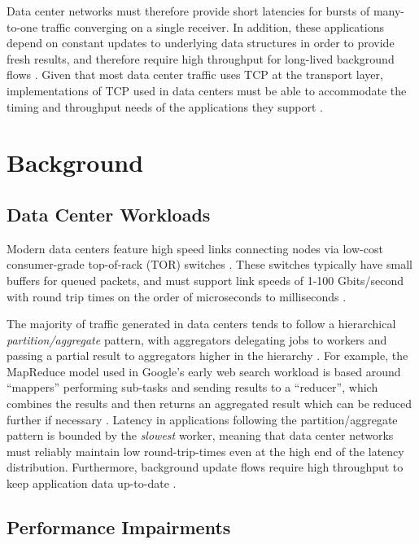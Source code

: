 \documentclass[letterpaper,twocolumn,10pt]{article}
\begin{document}
Data center networks must therefore provide short latencies for bursts of many-to-one traffic converging on a single receiver. In addition, these applications depend on constant updates to underlying data structures in order to provide fresh results, and therefore require high throughput for long-lived background flows \cite{alizadeh_data_2010, chen_understanding_2009, wu_ictcp:_2013}. Given that most data center traffic uses TCP at the transport layer, implementations of TCP used in data centers must be able to accommodate the timing and throughput needs of the applications they support \cite{alizadeh_data_2010}. 

\section{Background}

\subsection{Data Center Workloads}

Modern data centers feature high speed links connecting nodes via low-cost consumer-grade top-of-rack (TOR) switches \cite{alizadeh_data_2010}. These switches typically have small buffers for queued packets, and must support link speeds of 1-100 Gbits/second with round trip times on the order of microseconds to milliseconds \cite{alizadeh_data_2010, chen_understanding_2009}.

The majority of traffic generated in data centers tends to follow a hierarchical \emph{partition/aggregate} pattern, with aggregators delegating jobs to workers and passing a partial result to aggregators higher in the hierarchy \cite{alizadeh_data_2010}. For example, the MapReduce model used in Google's early web search workload is based around ``mappers'' performing sub-tasks and sending results to a ``reducer'', which combines the results and then returns an aggregated result which can be reduced further if necessary \cite{dean_mapreduce:_2004}. Latency in applications following the partition/aggregate pattern is bounded by the \emph{slowest} worker, meaning that data center networks must reliably maintain low round-trip-times even at the high end of the latency distribution. Furthermore, background update flows require high throughput to keep application data up-to-date \cite{alizadeh_data_2010}.

\subsection{Performance Impairments}
\end{document}
